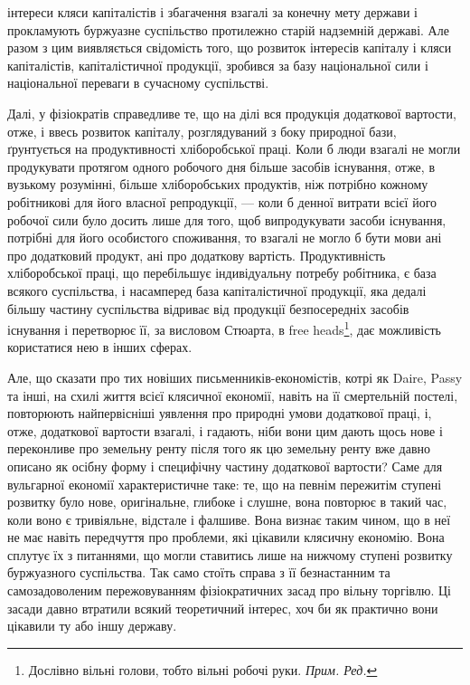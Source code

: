 \parcont{}  %
інтереси кляси капіталістів і збагачення взагалі за конечну мету держави і прокламують
буржуазне суспільство протилежно старій надземній державі. Але разом
з цим виявляється свідомість того, що розвиток інтересів капіталу і кляси капіталістів,
капіталістичної продукції, зробився за базу національної сили і національної
переваги в сучасному суспільстві.

Далі, у фізіократів справедливе те, що на ділі вся продукція додаткової вартости,
отже, і ввесь розвиток капіталу, розглядуваний з боку природної бази,
ґрунтується на продуктивності хліборобської праці. Коли б люди взагалі не могли
продукувати протягом одного робочого дня більше засобів існування, отже, в вузькому
розумінні, більше хліборобських продуктів, ніж потрібно кожному робітникові
для його власної репродукції, — коли б денної витрати всієї його робочої сили
було досить лише для того, щоб випродукувати засоби існування, потрібні для
його особистого споживання, то взагалі не могло б бути мови ані про додатковий
продукт, ані про додаткову вартість. Продуктивність хліборобської праці, що
перебільшує індивідуальну потребу робітника, є база всякого суспільства, і насамперед
база капіталістичної продукції, яка дедалі більшу частину суспільства
відриває від продукції безпосередніх засобів існування і перетворює її, за висловом
Стюарта, в free heads\footnote*{
Дослівно вільні голови, тобто вільні робочі руки. \emph{Прим. Ред.}
}, дає можливість користатися нею в інших сферах.

Але, що сказати про тих новіших письменників-економістів, котрі як
Daire, Passy та інші, на схилі життя всієї клясичної економії, навіть на її смертельній
постелі, повторюють найпервісніші уявлення про природні умови додаткової
праці, і, отже, додаткової вартости взагалі, і гадають, ніби вони цим дають
щось нове і переконливе про земельну ренту після того як цю земельну ренту
вже давно описано як осібну форму і специфічну частину додаткової вартости?
Саме для вульгарної економії характеристичне таке: те, що на певнім пережитім ступені
розвитку було нове, оригінальне, глибоке і слушне, вона повторює в
такий час, коли воно є тривіяльне, відстале і фалшиве. Вона визнає таким
чином, що в неї не має навіть передчуття про проблеми, які цікавили клясичну
економію. Вона сплутує їх з питаннями, що могли ставитись лише на нижчому
ступені розвитку буржуазного суспільства. Так само стоїть справа з її безнастанним
та самозадоволеним пережовуванням фізіократичних засад про вільну
торгівлю. Ці засади давно втратили всякий теоретичний інтерес, хоч би як
практично вони цікавили ту або іншу державу.

